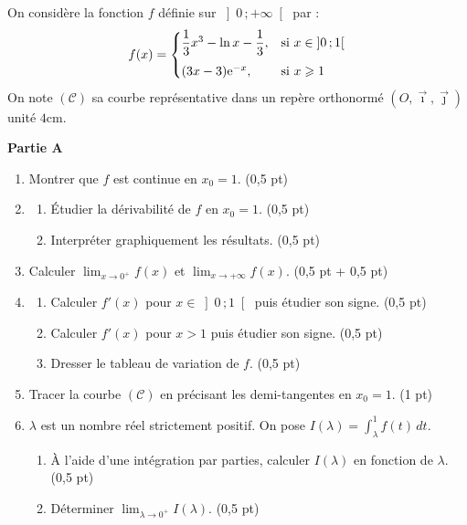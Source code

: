 

On considère la fonction $f$ définie sur $\left]0\,;+\infty\right[$ par :
$$
f(x) =
\begin{cases}
	\dfrac{1}{3}x^3 - \ln x - \dfrac{1}{3}, & \text{si } x \in \left]0\,;1\right[ \\[8pt]
	(3x-3)\mathrm{e}^{-x}, & \text{si } x \geqslant 1
\end{cases}
$$
On note $(\mathscr{C})$ sa courbe représentative dans un repère orthonormé $(O,\vec{\imath},\vec{\jmath})$ unité $4\text{cm}$.

\medskip
\noindent\textbf{Partie A}

\begin{enumerate}
	\item Montrer que $f$ est continue en $x_0 = 1$. \hfill (0,5 pt)
	\item
	\begin{enumerate}
		\item Étudier la dérivabilité de $f$ en $x_0 = 1$. \hfill (0,5 pt)
		\item Interpréter graphiquement les résultats. \hfill (0,5 pt)
	\end{enumerate}
	\item Calculer $\displaystyle\lim_{x\to0^+} f(x)$ et $\displaystyle\lim_{x\to+\infty} f(x)$. \hfill (0,5 pt + 0,5 pt)
	\item
	\begin{enumerate}
		\item Calculer $f'(x)$ pour $x \in \left]0\,;1\right[$ puis étudier son signe. \hfill (0,5 pt)
		\item Calculer $f'(x)$ pour $x > 1$ puis étudier son signe. \hfill (0,5 pt)
		\item Dresser le tableau de variation de $f$. \hfill (0,5 pt)
	\end{enumerate}
	\item Tracer la courbe $(\mathscr{C})$ en précisant les demi-tangentes en $x_0 = 1$. \hfill (1 pt)
	\item $\lambda$ est un nombre réel strictement positif. On pose $I(\lambda) = \displaystyle\int_\lambda^1 f(t)\,dt$.
	\begin{enumerate}
		\item À l'aide d'une intégration par parties, calculer $I(\lambda)$ en fonction de $\lambda$. \hfill (0,5 pt)
		\item Déterminer $\displaystyle\lim_{\lambda\to0^+} I(\lambda)$. \hfill (0,5 pt)
	\end{enumerate}
\end{enumerate}

